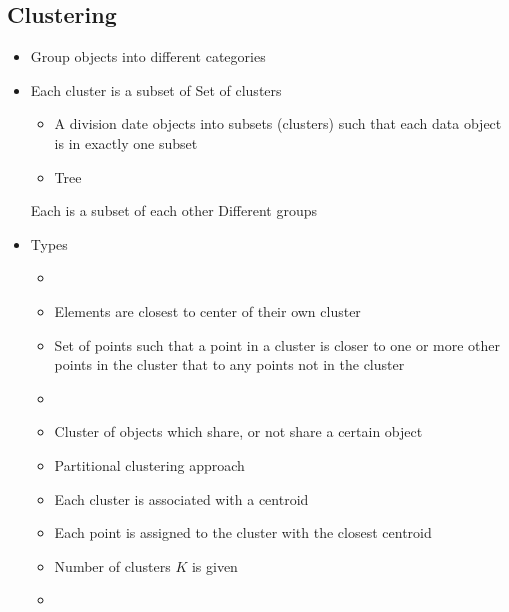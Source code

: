 \subsection{Clustering}
\begin{itemize}
    \item Group objects into different categories
    \item Each cluster is a subset of 
     Set of clusters
        \begin{itemize}
            \item A division date objects into subsets (clusters) such that each data object is in exactly one subset
        \end{itemize}
        \begin{itemize}
            \item Tree
        \end{itemize}
     Each is a subset of each other
     Different groups
    \item Types
            \begin{itemize}
                \item
            \end{itemize}
            \begin{itemize}
                \item Elements are closest to center of their own cluster
            \end{itemize}
            \begin{itemize}
                \item Set of points such that a point in a cluster is closer to one or more other points in the cluster that to any points not in the cluster
            \end{itemize}
            \begin{itemize}
                \item
            \end{itemize}
            \begin{itemize}
                \item Cluster of objects which share, or not share a certain object
            \end{itemize}
            \begin{itemize}
                \item Partitional clustering approach
                \item Each cluster is associated with a centroid
                \item Each point is assigned to the cluster with the closest centroid
                \item Number of clusters $K$ is given
                \item


\end{itemize}
\end{itemize}
